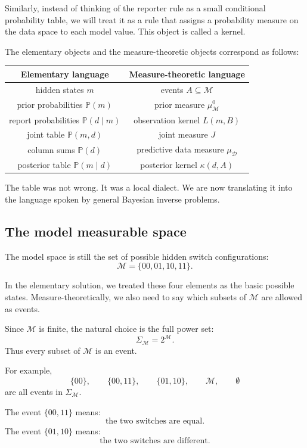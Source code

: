 \documentclass[11pt]{article}
\newcommand{\M}{\mathcal{M}}
\newcommand{\D}{\mathcal{D}}
\newcommand{\SigmaM}{\Sigma_{\M}}
\newcommand{\muMzero}{\mu^0_{\M}}
\newcommand{\muD}{\mu_{\D}}
\begin{document}
Similarly, instead of thinking of the reporter rule as a small conditional probability table, we will treat it as a rule that assigns a probability measure on the data space to each model value. This object is called a kernel.

The elementary objects and the measure-theoretic objects correspond as follows:

\begin{center}
\begin{tabular}{c c}
\toprule
Elementary language & Measure-theoretic language \\
\midrule
hidden states \(m\) & events \(A\subseteq \M\) \\
prior probabilities \(\mathbb{P}(m)\) & prior measure \(\muMzero\) \\
report probabilities \(\mathbb{P}(d\mid m)\) & observation kernel \(L(m,B)\) \\
joint table \(\mathbb{P}(m,d)\) & joint measure \(J\) \\
column sums \(\mathbb{P}(d)\) & predictive data measure \(\muD\) \\
posterior table \(\mathbb{P}(m\mid d)\) & posterior kernel \(\kappa(d,A)\) \\
\bottomrule
\end{tabular}
\end{center}

The table was not wrong. It was a local dialect. We are now translating it into the language spoken by general Bayesian inverse problems.

\subsection{The model measurable space}

The model space is still the set of possible hidden switch configurations:
\[
    \M=\{00,01,10,11\}.
\]

In the elementary solution, we treated these four elements as the basic possible states. Measure-theoretically, we also need to say which subsets of \(\M\) are allowed as events.

Since \(\M\) is finite, the natural choice is the full power set:
\[
    \SigmaM = 2^{\M}.
\]
Thus every subset of \(\M\) is an event.

For example,
\[
    \{00\},
    \qquad
    \{00,11\},
    \qquad
    \{01,10\},
    \qquad
    \M,
    \qquad
    \emptyset
\]
are all events in \(\SigmaM\).

The event \(\{00,11\}\) means:
\[
    \text{the two switches are equal}.
\]
The event \(\{01,10\}\) means:
\[
    \text{the two switches are different}.
\]
\end{document}
